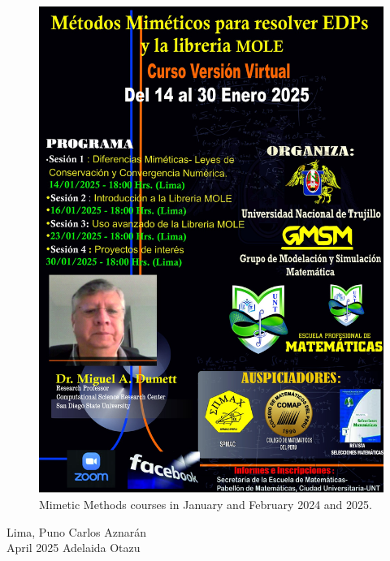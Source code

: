\begin{figure}[ht!]
	\includegraphics[width=.32\paperwidth]{mole2025}
	\caption*{\sffamily Mimetic Methods courses in January and February 2024 and 2025.}
\end{figure}

\begin{flushright}
	Lima, Puno \hfill Carlos Aznarán \\[.5\baselineskip]

	April 2025 \hfill Adelaida Otazu
\end{flushright}
